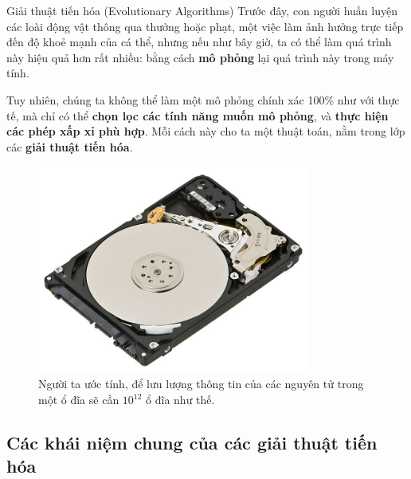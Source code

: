 \begin{frame}{Giải thuật tiến hóa (Evolutionary Algorithms)}
  Trước đây, con người huấn luyện các loài động vật thông qua thưởng hoặc
phạt, một việc làm ảnh hưởng trực tiếp đến độ khoẻ mạnh của cá thể, nhưng nếu
như bây giờ, ta có thể làm quá trình này hiệu quả hơn rất nhiều: bằng cách
\textbf{mô phỏng} lại quá trình này trong máy tính.

  Tuy nhiên, chúng ta không thể làm một mô phỏng chính xác 100\%
như với thực tế, mà chỉ có thể \textbf{chọn lọc các tính năng muốn mô phỏng}, và
\textbf{thực hiện các phép xấp xỉ phù hợp}. Mỗi cách này cho ta một thuật toán,
nằm trong lớp các \textbf{giải thuật tiến hóa}.

\begin{figure}
  \centering
  \includegraphics[width=0.8\textwidth, height=0.2\textheight,
  keepaspectratio]{res/hdd.jpg}
\captionsetup{justification=centering,margin=2.5cm}
  \caption{Người ta ước tính, để lưu lượng thông tin của
  các nguyên tử trong một ổ đĩa sẽ cần $10^{12}$ ổ đĩa như thế.}
\end{figure}
\end{frame}


\subsection{Các khái niệm chung của các giải thuật tiến hóa} %
\label{sub:Các khái niệm chung của các giải thuật tiến hóa}

